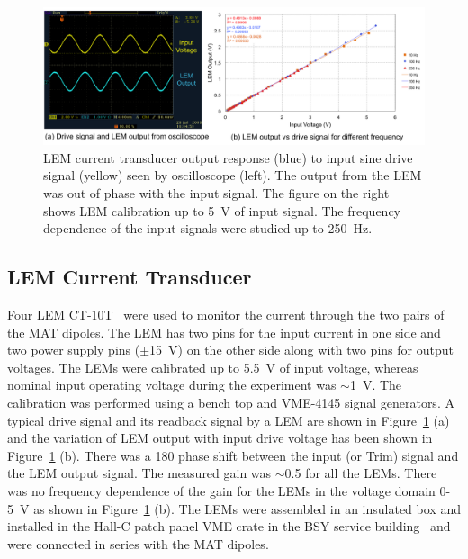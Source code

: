 \begin{singlespace}
\begin{figure}[!h]
	\begin{center}
	\includegraphics[width=15.0cm]{figures/BModLEMCalibration}
	\end{center}
	\caption
	{LEM current transducer output response (blue) to input sine drive signal (yellow) seen by oscilloscope (left). The output from the LEM was out of phase with the input signal. The figure on the right shows LEM calibration up to 5~V of input signal. The frequency dependence of the input signals were studied up to 250~Hz.%
	}
	\label{fig:BModLEMCalibration}
\end{figure}
\end{singlespace}


\subsection{LEM Current Transducer}
\label{LEM Current Transducer}
Four LEM CT-10T~\cite{LEM_CT-10T} were used to monitor the current through the two pairs of the MAT dipoles. 
The LEM has two pins for the input current in one side and two power supply pins ($\pm$15~V) on the other side along with two pins for output voltages. The LEMs were calibrated up to 5.5~V of input voltage, whereas nominal input operating voltage during the experiment was $\sim$1~V. The calibration was performed using a bench top and VME-4145 signal generators. A typical drive signal and its readback signal by a LEM are shown in Figure~\ref{fig:BModLEMCalibration} (a) and the variation of LEM output with input drive voltage has been shown in Figure~\ref{fig:BModLEMCalibration} (b). There was a 180\degrees{} phase shift between the input (or Trim) signal and the LEM output signal. The measured gain was $\sim$0.5 for all the LEMs. There was no frequency dependence of the gain for the LEMs in the voltage domain 0-5~V as shown in Figure~\ref{fig:BModLEMCalibration} (b). The LEMs were assembled in an insulated box and installed in the Hall-C patch panel VME crate in the BSY service building~\cite{philip_communication} and were connected in series with the MAT dipoles. 

